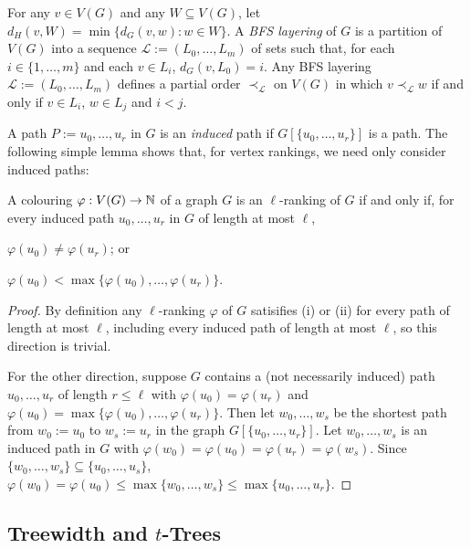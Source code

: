 \documentclass[kpfonts]{patmorin}
\theoremstyle{named}
\begin{document}
For any $v\in V(G)$ and any $W\subseteq V(G)$, let $d_H(v,W)=\min\{d_G(v,w):w\in W\}$. A \emph{BFS layering} of $G$ is a partition of $V(G)$ into a sequence $\mathcal{L}:=(L_0,\ldots,L_m)$ of sets such that, for each $i\in\{1,\ldots,m\}$ and each $v\in L_i$, $d_G(v,L_0)=i$.  Any BFS layering $\mathcal{L}:=(L_0,\ldots,L_m)$ defines a partial order $\prec_{\mathcal{L}}$ on $V(G)$ in which $v\prec_{\mathcal{L}} w$ if and only if $v\in L_i$, $w\in L_j$ and $i<j$.

A path $P:=u_0,\ldots,u_r$ in $G$ is an \emph{induced} path if $G[\{u_0,\ldots,u_r\}]$ is a path.  The following simple lemma shows that, for vertex rankings, we need only consider induced paths:

\begin{obs}\label{induced-paths-only}
    A colouring $\varphi:V(G)\to\mathbb{N}$ of a graph $G$ is an $\ell$-ranking of $G$ if and only if, for every induced path $u_0,\ldots,u_r$ in $G$ of length at most $\ell$,
    \begin{inparaenum}[(i)]
        \item $\varphi(u_0)\neq\varphi(u_r)$; or
        \item $\varphi(u_0)<\max\{\varphi(u_0),\ldots,\varphi(u_r)\}$.
    \end{inparaenum}
\end{obs}

\begin{proof}
    By definition any $\ell$-ranking $\varphi$ of $G$ satisifies (i) or (ii) for every path of length at most $\ell$, including every induced path of length at most $\ell$, so this direction is trivial.

    For the other direction, suppose $G$ contains a (not necessarily induced) path $u_0,\ldots,u_r$ of length $r\le\ell$ with $\varphi(u_0)=\varphi(u_r)$ and $\varphi(u_0)=\max\{\varphi(u_0),\ldots,\varphi(u_r)\}$.  Then let $w_0,\ldots,w_s$ be the shortest path from $w_0:=u_0$ to $w_s:=u_r$ in  the graph $G[\{u_0,\ldots,u_r\}]$.  Let $w_0,\ldots,w_s$ is an induced path in $G$ with $\varphi(w_0)=\varphi(u_0)=\varphi(u_r)=\varphi(w_s)$. Since $\{w_0,\ldots,w_s\}\subseteq\{u_0,\ldots,u_s\}$, $\varphi(w_0)=\varphi(u_0)\le\max\{w_0,\ldots,w_s\}\le \max\{u_0,\ldots,u_r\}$.
\end{proof}


\subsection{Treewidth and $t$-Trees}
\end{document}
